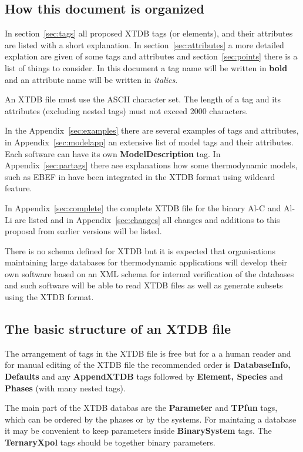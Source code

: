 \documentclass{article}
\begin{document}
\subsection{How this document is organized}

In section~\ref{sec:tags} all proposed XTDB tags (or elements), and
their attributes are listed with a short explanation.  In
section~\ref{sec:attributes} a more detailed explation are given of
some tags and attributes and section~\ref{sec:points} there is a list
of things to consider.  In this document a tag name will be written in
{\bf bold} and an attribute name will be written in {\em italics}.

An XTDB file must use the ASCII character set.  The length of a tag
and its attributes (excluding nested tags) must not exceed 2000
characters.

In the Appendix~\ref{sec:examples} there are several examples of tags
and attributes, in Appendix~\ref{sec:modelapp} an extensive list of
model tags and their attributes.  Each software can have its own {\bf
  ModelDescription} tag.  In Appendix~\ref{sec:partags} there aee
explanations how some thermodynamic models, such as EBEF in have been
integrated in the XTDB format using wildcard feature.

In Appendix~\ref{sec:complete} the complete XTDB file for the binary
Al-C and Al-Li are listed and in Appendix~\ref{sec:changes} all
changes and additions to this proposal from earlier versions will be
listed.

There is no schema defined for XTDB but it is expected that
organisations maintaining large databases for thermodynamic
applications will develop their own software based on an XML schema
for internal verification of the databases and such software will be
able to read XTDB files as well as generate subsets using the XTDB
format.

\subsection{The basic structure of an XTDB file}

The arrangement of tags in the XTDB file is free but for a a human
reader and for manual editing of the XTDB file the recommended order
is {\bf DatabaseInfo, Defaults} and any {\bf AppendXTDB} tags followed
by {\bf Element, Species} and {\bf Phases} (with many nested tags).

The main part of the XTDB databas are the {\bf Parameter} and {\bf
  TPfun} tags, which can be ordered by the phases or by the systems.
For maintaing a database it may be convenient to keep parameters
inside {\bf BinarySystem} tags.  The {\bf TernaryXpol} tags should be
together binary parameters.
\end{document}
